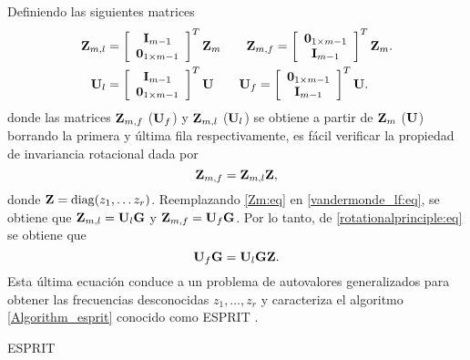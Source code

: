 	Definiendo las siguientes matrices
	\begin{align}
		\mathbf{Z}_{m,l} &= \left[\begin{array}{c}
		\mathbf{I}_{m-1} \\ \mathbf{0}_{1\times m-1}
		\end{array}\right]^T\mathbf{Z}_m \qquad \mathbf{Z}_{m,f} = \left[\begin{array}{c}\mathbf{0}_{1\times m-1} \\ \mathbf{I}_{m-1}\end{array}\right]^T\mathbf{Z}_m.
		\label{vandermonde_lf:eq}\\
		\mathbf{U}_{l} &=\left[\begin{array}{c}
		\mathbf{I}_{m-1} \\ \mathbf{0}_{1\times m-1}
		\end{array}\right]^T\mathbf{U} \qquad \mathbf{U}_{f} = \left[\begin{array}{c}\mathbf{0}_{1\times m-1} \\ \mathbf{I}_{m-1}\end{array}\right]^T\mathbf{U}. \nonumber
	\end{align}
	donde las matrices $\mathbf{Z}_{m,f}$ ($\mathbf{U}_f$) y $\mathbf{Z}_{m,l}$ ($\mathbf{U}_l$) se obtiene a partir de $\mathbf{Z}_{m}$ ($\mathbf{U}$) borrando la primera y última fila respectivamente, es fácil verificar la propiedad de invariancia rotacional dada por
	\begin{equation}
		\mathbf{Z}_{m,f} = \mathbf{Z}_{m,l}\mathbf{Z},
		\label{rotationalprinciple:eq}
	\end{equation}
	donde $\mathbf{Z} = \mathrm{diag}(z_1, \ldots z_r)$. Reemplazando \eqref{Zm:eq} en  \eqref{vandermonde_lf:eq}, se obtiene que  $\mathbf{Z}_{m,l}  = \mathbf{U}_l \mathbf{G}$ y 
	$\mathbf{Z}_{m,f}  = \mathbf{U}_f \mathbf{G}$. Por lo tanto, de \eqref{rotationalprinciple:eq} se obtiene que 
	\begin{equation}
		\mathbf{U}_{f} \mathbf{G} = \mathbf{U}_{l}\mathbf{G}\mathbf{Z}. 
		\label{Esprit:eq}
	\end{equation}
	Esta última ecuación conduce a un problema de autovalores generalizados para obtener las frecuencias desconocidas $z_1,\ldots, z_r$ y caracteriza el algoritmo \eqref{Algorithm_esprit} conocido como ESPRIT  \cite{Roy1989}.

	\begin{algorithm}
		\caption{ESPRIT}
		\begin{algorithmic}[1]
		\end{algorithmic}
		\label{Algorithm_esprit}
	\end{algorithm}	

